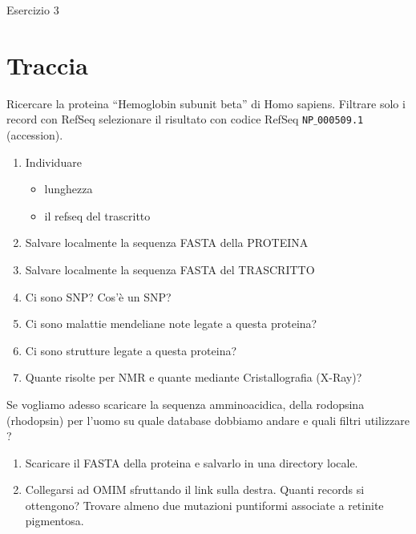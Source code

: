 \documentclass{article}
\begin{document}
\begin{center}
   \huge
   Esercizio 3
\end{center}
\section*{Traccia}
Ricercare la proteina “Hemoglobin subunit beta” di Homo sapiens. Filtrare solo i record con RefSeq selezionare il risultato con codice RefSeq \texttt{NP$\_$000509.1} (accession).
\begin{enumerate}
   \item Individuare
   \begin{itemize}
      \item lunghezza
      \item il refseq del trascritto
   \end{itemize}
   \item Salvare localmente la sequenza FASTA della PROTEINA
   \item Salvare localmente la sequenza FASTA del TRASCRITTO
   \item Ci sono SNP? Cos'è un SNP?
   \item Ci sono malattie mendeliane note legate a questa proteina?
   \item Ci sono strutture legate a questa proteina?
      \item Quante risolte per NMR e quante mediante Cristallografia (X-Ray)?
\end{enumerate}
Se vogliamo adesso scaricare la sequenza amminoacidica, della rodopsina (rhodopsin) per l'uomo su quale database dobbiamo andare e quali filtri utilizzare ?
\begin{enumerate}
   \item Scaricare il FASTA della proteina e salvarlo in una directory locale.
   \item Collegarsi ad OMIM sfruttando il link sulla destra. Quanti records si ottengono? Trovare almeno due mutazioni puntiformi associate a retinite pigmentosa.
\end{enumerate}
\end{document}
